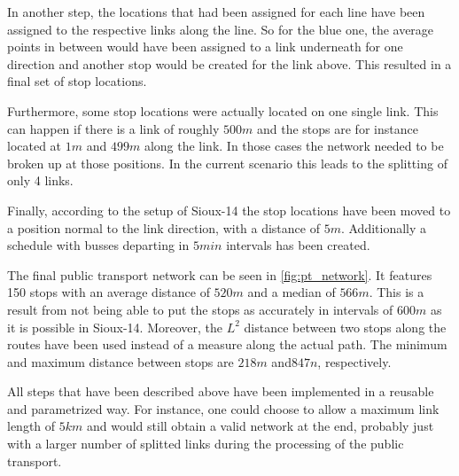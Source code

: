 In another step, the locations that had been assigned for each line have been
assigned to the respective links along the line. So for the blue one, the average
points in between would have been assigned to a link underneath for one direction
and another stop would be created for the link above. This resulted in a final
set of stop locations.

Furthermore, some stop locations were actually located on one single link. This
can happen if there is a link of roughly $500m$ and the stops are for instance
located at $1m$ and $499m$ along the link. In those cases the network needed to
be broken up at those positions. In the current scenario this leads to the splitting
of only 4 links.

Finally, according to the setup of Sioux-14 the stop locations have been moved
to a position normal to the link direction, with a distance of $5m$. Additionally
a schedule with busses departing in $5min$ intervals has been created.

The final public transport network can be seen in \cref{fig:pt_network}. It features
150 stops with an average distance of $520m$ and a median of $566m$. This is a
result from not being able to put the stops as accurately in intervals of $600m$
as it is possible in Sioux-14. Moreover, the $L^2$ distance between two stops along
the routes have been used instead of a measure along the actual path. The minimum
and maximum distance between stops are $218m$ and$847n$, respectively.

All steps that have been described above have been implemented in a reusable and
parametrized way. For instance, one could choose to allow a maximum link length of
$5km$ and would still obtain a valid network at the end, probably just with a larger
number of splitted links during the processing of the public transport.

